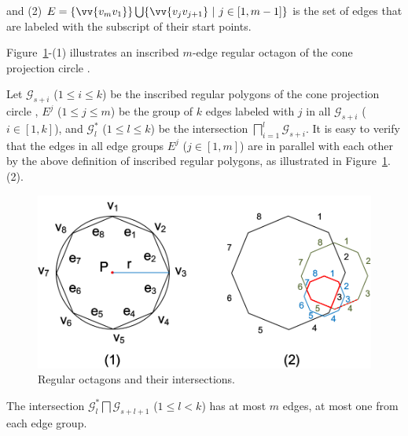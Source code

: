 \ni and (2) $E= \{\vv{v_mv_1}\} \bigcup \{\vv{v_jv_{j+1}}\ |\ j\in [1, m-1]\}$ is the set of edges that are labeled with the subscript of their start points.


Figure~\ref{fig:polygons}-(1) illustrates an inscribed $m$-edge regular octagon of the cone projection  circle  .

Let $\mathcal{G}_{s+i}$ ($1\le i \le k$) be the inscribed regular polygons of the cone projection  circle ,
$E^j$ ($1\le j \le m$) be the group of $k$ edges labeled with $j$ in all $\mathcal{G}_{s+i}$ ($i\in[1, k]$), and $\mathcal{G}^*_l$ ($1\le l\le k$) be the intersection 
 $\bigsqcap_{i=1}^{l}\mathcal{G}_{s+i}$.
%
It is easy to verify that the edges in all edge groups $E^j$ ($j\in[1, m]$) are in parallel with each other by the above definition of inscribed regular polygons, as illustrated in Figure~\ref{fig:polygons}.(2).






\begin{figure}[tb!]
\centering
\includegraphics[scale=0.88]{figures/Fig-polygons.png}
\vspace{-1ex}
\caption{\small Regular octagons and their intersections.}
\vspace{-2ex}
\label{fig:polygons}
\end{figure}


\begin{prop}
\label{prop-rp-intersection}
The intersection $\mathcal{G}^*_l \bigsqcap \mathcal{G}_{s+l+1}$ ($ 1\le l< k$) has at most $m$ edges, \ie at most one from each edge group.
\end{prop}





